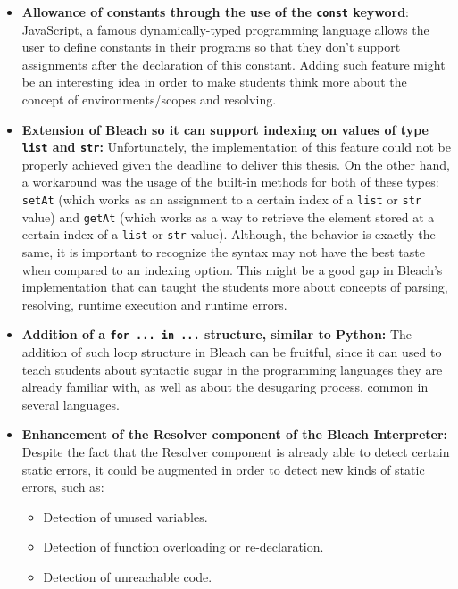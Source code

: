 \begin{itemize}
    \item \textbf{Allowance of constants through the use of the \texttt{const} keyword}: JavaScript, a famous dynamically-typed programming language allows the user to define constants in their programs so that they don't support assignments after the declaration of this constant. Adding such feature might be an interesting idea in order to make students think more about the concept of environments/scopes and resolving.

    \item \textbf{Extension of Bleach so it can support indexing on values of type \texttt{list} and \texttt{str}:} Unfortunately, the implementation of this feature could not be properly achieved given the deadline to deliver this thesis. On the other hand, a workaround was the usage of the built-in methods for both of these types: \texttt{setAt} (which works as an assignment to a certain index of a \texttt{list} or \texttt{str} value) and \texttt{getAt} (which works as a way to retrieve the element stored at a certain index of a \texttt{list} or \texttt{str} value). Although, the behavior is exactly the same, it is important to recognize the syntax may not have the best taste when compared to an indexing option. This might be a good gap in Bleach's implementation that can taught the students more about concepts of parsing, resolving, runtime execution and runtime errors.

    \item \textbf{Addition of a \texttt{for ... in ...} structure, similar to Python:} The addition of such loop structure in Bleach can be fruitful, since it can used to teach students about syntactic sugar in the programming languages they are already familiar with, as well as about the desugaring process, common in several languages.

    \item \textbf{Enhancement of the Resolver component of the Bleach Interpreter:} Despite the fact that the Resolver component is already able to detect certain static errors, it could be augmented in order to detect new kinds of static errors, such as:
        \begin{itemize}
            \item Detection of unused variables.
            \item Detection of function overloading or re-declaration.
            \item Detection of unreachable code.
        \end{itemize}


\end{itemize}
